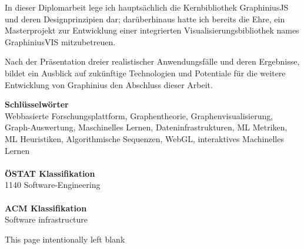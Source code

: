 In dieser Diplomarbeit lege ich hauptsächlich die Kernbibliothek GraphiniusJS und deren Designprinzipien dar; darüberhinaus hatte ich bereits die Ehre, ein Masterprojekt zur Entwicklung einer integrierten Visualisierungsbibliothek names GraphiniusVIS mitzubetreuen.

Nach der Präsentation dreier realistischer Anwendungsfälle und deren Ergebnisse, bildet ein Ausblick auf zukünftige Technologien und Potentiale für die weitere Entwicklung von Graphinius den Abschluss dieser Arbeit.



\vfill
\noindent
\textbf{Schlüsselwörter}\\
Webbasierte Forschungsplattform, Graphentheorie, Graphenvisualisierung, Graph-Auswertung, Maschinelles Lernen, Dateninfrastrukturen, ML Metriken, ML Heuristiken, Algorithmische Sequenzen, WebGL, interaktives Machinelles Lernen\\
\\
\textbf{ÖSTAT Klassifikation}\\
1140 Software-Engineering\\
\\
\textbf{ACM Klassifikation}\\
Software infrastructure

\clearpage
\begin{center}
This page intentionally left blank
\end{center}
\clearpage


